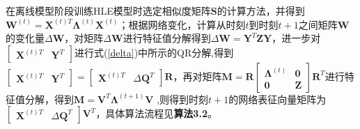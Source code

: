 在离线模型阶段训练HLE模型时选定相似度矩阵$\textbf{S}$的计算方法，并得到$\textbf{W}^{(t)} = \textbf{X}^{(t)T} \bm{\Lambda}^{(t)} \textbf{X} ^{(t)}$；根据网络变化，计算从时刻$t$到时刻$t+1$之间矩阵$\textbf{W}$的变化量$\Delta\textbf{W}$，对矩阵$\Delta\textbf{W}$进行特征值分解得到$\Delta\textbf{W} =  \textbf{Y}^{T} \textbf{Z}  \textbf{Y}$，进一步对$\begin{bmatrix} \textbf{X}^{(t)T} & \textbf{Y}^{T}\end{bmatrix}$进行式(\ref{delta})中所示的QR分解,得到$\begin{bmatrix} \textbf{X}^{(t)T} & \textbf{Y}^{T}\end{bmatrix} = \begin{bmatrix} \textbf{X}^{(t)T} & \Delta\textbf{Q}^{T} \end{bmatrix} \textbf{R}$，再对矩阵$\textbf{M} = \textbf{R}\begin{bmatrix}  \bm{\Lambda}^{(t)} & \textbf{0}\\
\textbf{0} & \textbf{Z} \end{bmatrix}
\textbf{R}^T$进行特征值分解，得到$\textbf{M} =\textbf{V}^T \bm{\Lambda}^{(t+1)} \textbf{V}$
,则得到时刻$t+1$的网络表征向量矩阵为$\begin{bmatrix} \textbf{X}^{(t)T} & \Delta\textbf{Q}^{T} \end{bmatrix} \textbf{V}^T$，具体算法流程见\textbf{算法3.2}。%

